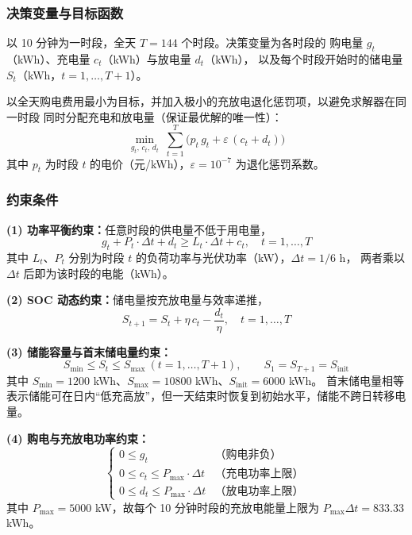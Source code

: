 \documentclass[12pt,a4paper]{article}
\begin{document}
\subsubsection{决策变量与目标函数}

以 10 分钟为一时段，全天 $T = 144$ 个时段。决策变量为各时段的
购电量 $g_t$（kWh）、充电量 $c_t$（kWh）与放电量 $d_t$（kWh），
以及每个时段开始时的储电量 $S_t$（kWh，$t = 1, \ldots, T+1$）。

以全天购电费用最小为目标，并加入极小的充放电退化惩罚项，以避免求解器在同一时段
同时分配充电和放电量（保证最优解的唯一性）：
\begin{equation}
    \min_{g_t,\,c_t,\,d_t}\; \sum_{t=1}^{T}\Big(p_t\,g_t + \varepsilon\,(c_t + d_t)\Big)
    \label{eq:q1_obj}
\end{equation}
其中 $p_t$ 为时段 $t$ 的电价（元/kWh），$\varepsilon = 10^{-7}$ 为退化惩罚系数。

\subsubsection{约束条件}

\textbf{(1) 功率平衡约束：}任意时段的供电量不低于用电量，
\begin{equation}
    g_t + P_t \cdot \Delta t + d_t \geq L_t \cdot \Delta t + c_t, \quad t = 1, \ldots, T
    \label{eq:q1_balance}
\end{equation}
其中 $L_t$、$P_t$ 分别为时段 $t$ 的负荷功率与光伏功率（kW），$\Delta t = 1/6$ h，
两者乘以 $\Delta t$ 后即为该时段的电能（kWh）。

\textbf{(2) SOC 动态约束：}储电量按充放电量与效率递推，
\begin{equation}
    S_{t+1} = S_t + \eta\,c_t - \frac{d_t}{\eta}, \quad t = 1, \ldots, T
    \label{eq:q1_soc}
\end{equation}

\textbf{(3) 储能容量与首末储电量约束：}
\begin{equation}
    S_{\min} \leq S_t \leq S_{\max}\ (t = 1, \ldots, T+1),
    \qquad S_1 = S_{T+1} = S_{\text{init}}
    \label{eq:q1_socbound}
\end{equation}
其中 $S_{\min} = 1200$ kWh、$S_{\max} = 10800$ kWh、$S_{\text{init}} = 6000$ kWh。
首末储电量相等表示储能可在日内“低充高放”，但一天结束时恢复到初始水平，储能不跨日转移电量。

\textbf{(4) 购电与充放电功率约束：}
\begin{equation}
    \begin{cases}
        0 \leq g_t & \text{（购电非负）} \\[2pt]
        0 \leq c_t \leq P_{\max}\cdot\Delta t & \text{（充电功率上限）} \\[2pt]
        0 \leq d_t \leq P_{\max}\cdot\Delta t & \text{（放电功率上限）}
    \end{cases}
    \label{eq:q1_bounds}
\end{equation}
其中 $P_{\max} = 5000$ kW，故每个 10 分钟时段的充放电能量上限为
$P_{\max}\Delta t = 833.33$ kWh。
\end{document}
